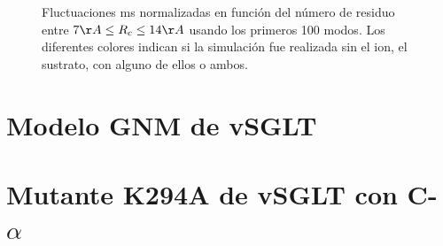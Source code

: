 \begin{figure}
 \caption{Fluctuaciones ms normalizadas en funci\'{o}n del n\'{u}mero de residuo entre $7\AA\leq R_c\leq 14\AA$ usando  los primeros 100 modos. Los diferentes colores indican si la simulaci\'{o}n fue realizada sin el ion, el sustrato, con alguno de ellos o ambos.}
\end{figure}
\section{Modelo GNM de vSGLT}

\section{Mutante K294A de vSGLT con C-$\alpha$}